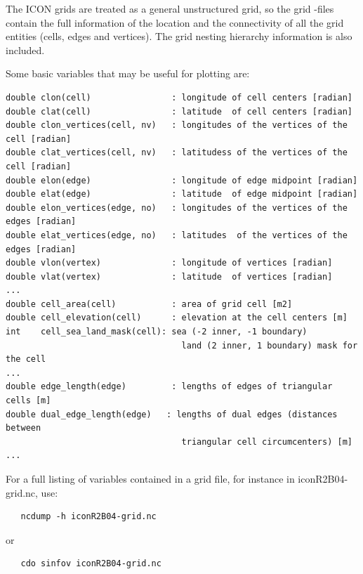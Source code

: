 The ICON grids are treated as a general unstructured grid, so the grid \netcdf -files contain the full information of the location and the connectivity of all the grid entities (cells, edges and vertices). The grid nesting hierarchy information is also included.

Some basic variables that may be useful for plotting are:

\begin{small}
  \begin{verbatim}
double clon(cell)                : longitude of cell centers [radian]
double clat(cell)                : latitude  of cell centers [radian]
double clon_vertices(cell, nv)   : longitudes of the vertices of the cell [radian]
double clat_vertices(cell, nv)   : latitudess of the vertices of the cell [radian]
double elon(edge)                : longitude of edge midpoint [radian]
double elat(edge)                : latitude  of edge midpoint [radian]
double elon_vertices(edge, no)   : longitudes of the vertices of the edges [radian]
double elat_vertices(edge, no)   : latitudes  of the vertices of the edges [radian]
double vlon(vertex)              : longitude of vertices [radian]
double vlat(vertex)              : latitude  of vertices [radian]
...
double cell_area(cell)           : area of grid cell [m2]
double cell_elevation(cell)      : elevation at the cell centers [m]
int    cell_sea_land_mask(cell): sea (-2 inner, -1 boundary) 
                                   land (2 inner, 1 boundary) mask for the cell
...
double edge_length(edge)         : lengths of edges of triangular cells [m]
double dual_edge_length(edge)   : lengths of dual edges (distances between
                                   triangular cell circumcenters) [m]
...
  \end{verbatim}
\end{small}

For a full listing of variables contained in a grid file, for instance in iconR2B04-grid.nc, use:

\begin{small}
  \begin{verbatim}
   ncdump -h iconR2B04-grid.nc  
  \end{verbatim}
\end{small}

or

\begin{small}
  \begin{verbatim}
   cdo sinfov iconR2B04-grid.nc
  \end{verbatim}
\end{small}

